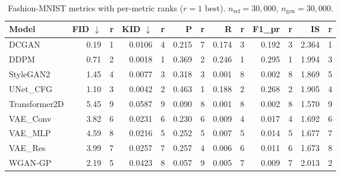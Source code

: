\begin{table}[H]
\centering
\small
\caption{Fashion-MNIST metrics with per-metric ranks ($r{=}1$ best). $n_{\text{ref}}{=}30{,}000$, $n_{\text{gen}}{=}30{,}000$.}
\label{tab:fashionmnist-ranked}
\begin{tabular}{lrrrrrrrrrrrr}
\toprule
\textbf{Model} & \textbf{FID} $\downarrow$ & \textbf{r} & \textbf{KID} $\downarrow$ & \textbf{r} & \textbf{P} & \textbf{r} & \textbf{R} & \textbf{r} & \textbf{F1\_pr} & \textbf{r} & \textbf{IS} & \textbf{r} \\
\midrule
DCGAN         & 0.19 & 1 & 0.0106 & 4 & 0.215 & 7 & 0.174 & 3 & 0.192 & 3 & 2.364 & 1 \\
DDPM          & 0.71 & 2 & 0.0018 & 1 & 0.369 & 2 & 0.246 & 1 & 0.295 & 1 & 1.994 & 3 \\
StyleGAN2     & 1.45 & 4 & 0.0077 & 3 & 0.318 & 3 & 0.001 & 8 & 0.002 & 8 & 1.869 & 5 \\
UNet\_CFG     & 1.10 & 3 & 0.0042 & 2 & 0.463 & 1 & 0.188 & 2 & 0.268 & 2 & 1.905 & 4 \\
Transformer2D & 5.45 & 9 & 0.0587 & 9 & 0.090 & 8 & 0.001 & 8 & 0.002 & 8 & 1.570 & 9 \\
VAE\_Conv     & 3.82 & 6 & 0.0231 & 6 & 0.230 & 6 & 0.009 & 4 & 0.017 & 4 & 1.692 & 6 \\
VAE\_MLP      & 4.59 & 8 & 0.0216 & 5 & 0.252 & 5 & 0.007 & 5 & 0.014 & 5 & 1.677 & 7 \\
VAE\_Res      & 3.99 & 7 & 0.0257 & 7 & 0.257 & 4 & 0.006 & 6 & 0.011 & 6 & 1.673 & 8 \\
WGAN-GP        & 2.19 & 5 & 0.0423 & 8 & 0.057 & 9 & 0.005 & 7 & 0.009 & 7 & 2.013 & 2 \\
\bottomrule
\end{tabular}
\end{table}

